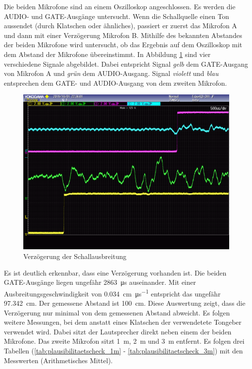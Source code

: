 Die beiden Mikrofone sind an einem Oszilloskop angeschlossen. Es werden die \si{AUDIO}- und \si{GATE}-Ausgänge untersucht. Wenn die Schallquelle einen Ton aussendet (durch Klatschen oder ähnliches), passiert er zuerst das Mikrofon A und dann mit einer Verzögerung Mikrofon B. Mithilfe des bekannten Abstandes der beiden Mikrofone wird untersucht, ob das Ergebnis auf dem Oszilloskop mit dem Abstand der Mikrofone übereinstimmt. In Abbildung \ref{img:plausibilitaetscheck_oszi} sind vier verschiedene Signale abgebildet. Dabei entspricht Signal \textit{gelb} dem \si{GATE}-Ausgang von Mikrofon A und \textit{grün} dem \si{AUDIO}-Ausgang. Signal \textit{violett} und \textit{blau} entsprechen dem \si{GATE}- und \si{AUDIO}-Ausgang von dem zweiten Mikrofon.

\begin{figure}[H]
        \centering
        \hspace*{-1.9cm}
        \includegraphics[width=1.2\textwidth]{images/plausibilitaetscheck_oszi.png}
        \caption{Verzögerung der Schallausbreitung}
        \label{img:plausibilitaetscheck_oszi}
\end{figure}

Es ist deutlich erkennbar, dass eine Verzögerung vorhanden ist. Die beiden \si{GATE}-Ausgänge liegen ungefähr \SI{2863}{\micro \second} auseinander. Mit einer Ausbreitungsgeschwindigkeit von \SI{0,034}{\centi\metre\per\micro\second} entspricht das ungefähr \SI{97,342}{\centi\metre}. Der gemessene Abstand ist \SI{100}{\centi\metre}. Diese Auswertung zeigt, dass die Verzögerung nur minimal von dem gemessenen Abstand abweicht. Es folgen weitere Messungen, bei dem anstatt eines Klatschen der verwendetete Tongeber verwendet wird. Dabei sitzt der Lautsprecher direkt neben einem der beiden Mikrofone. Das zweite Mikrofon sitzt \SI{1}{\metre}, \SI{2}{\metre} und \SI{3}{\metre} entfernt. Es folgen drei Tabellen (\ref{tab:plausibilitaetscheck_1m} - \ref{tab:plausibilitaetscheck_3m}) mit den Messwerten (Arithmetisches Mittel).


